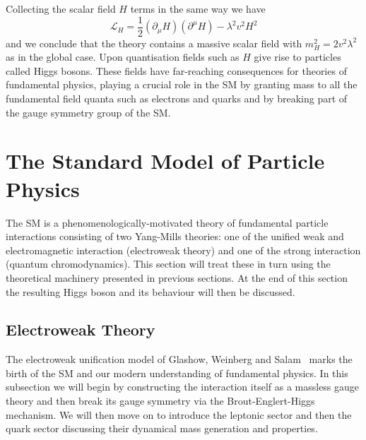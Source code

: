 Collecting the scalar field $H$ terms in the same way we have 
\begin{equation}
    \label{eq:theory:abelian_scalar_SSB_L}
    \mathcal{L}_{H} = \frac{1}{2}(\partial_{\mu}H)(\partial^{\mu}H) - \lambda^{2}v^{2}H^{2}%
\end{equation}
and we conclude that the theory contains a massive scalar field with $m_{H}^{2} = 2v^{2}\lambda^{2}$ as in the global case. Upon quantisation fields such as $H$ give rise to particles~\cite{HiggsPaper} called Higgs bosons. These fields have far-reaching consequences for theories of fundamental physics, playing a crucial role in the SM by granting mass to all the fundamental field quanta such as electrons and quarks and by breaking part of the gauge symmetry group of the SM. 


\section{The Standard Model of Particle Physics}
The SM is a phenomenologically-motivated theory of fundamental particle interactions consisting of two Yang-Mills theories: one of the unified weak and electromagnetic interaction (electroweak theory) and one of the strong interaction (quantum chromodynamics). This section will treat these in turn using the theoretical machinery presented in previous sections. At the end of this section the resulting Higgs boson and its behaviour will then be discussed. 
\subsection{Electroweak Theory}
The electroweak unification model of Glashow, Weinberg and Salam~\cite{Glashow,Weinberg,Salam} marks the birth of the SM and our modern understanding of fundamental physics. In this subsection we will begin by constructing the interaction itself as a massless gauge theory and then break its gauge symmetry via the Brout-Englert-Higgs mechanism. We will then move on to introduce the leptonic sector and then the quark sector discussing their dynamical mass generation and properties. 

